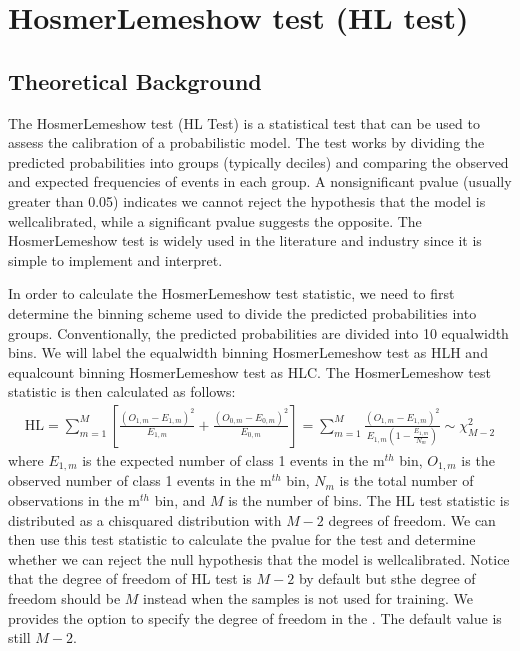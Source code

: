 \documentclass[letterpaper,10pt,english]{sphinxmanual}
\begin{document}
\sphinxstepscope


\chapter{Hosmer\sphinxhyphen{}Lemeshow test (HL test)}
\label{\detokenize{notebooks/hl_test:Hosmer-Lemeshow-test-(HL-test)}}\label{\detokenize{notebooks/hl_test::doc}}

\section{Theoretical Background}
\label{\detokenize{notebooks/hl_test:Theoretical-Background}}
\sphinxAtStartPar
The Hosmer\sphinxhyphen{}Lemeshow test (HL Test) is a statistical test that can be used to assess the calibration of a probabilistic model. The test works by dividing the predicted probabilities into groups (typically deciles) and comparing the observed and expected frequencies of events in each group. A non\sphinxhyphen{}significant p\sphinxhyphen{}value (usually greater than 0.05) indicates we cannot reject the hypothesis that the model is well\sphinxhyphen{}calibrated, while a significant p\sphinxhyphen{}value suggests the opposite. The Hosmer\sphinxhyphen{}Lemeshow test is
widely used in the literature and industry since it is simple to implement and interpret.

\sphinxAtStartPar
In order to calculate the Hosmer\sphinxhyphen{}Lemeshow test statistic, we need to first determine the binning scheme used to divide the predicted probabilities into groups. Conventionally, the predicted probabilities are divided into 10 equal\sphinxhyphen{}width bins. We will label the equal\sphinxhyphen{}width binning Hosmer\sphinxhyphen{}Lemeshow test as HL\sphinxhyphen{}H and equal\sphinxhyphen{}count binning Hosmer\sphinxhyphen{}Lemeshow test as HL\sphinxhyphen{}C. The Hosmer\sphinxhyphen{}Lemeshow test statistic is then calculated as follows:
\begin{equation*}
\begin{split}\text{HL} = \sum_{m=1}^{M} \left[\frac{(O_{1,m}-E_{1,m})^2}{E_{1,m}} + \frac{(O_{0,m}-E_{0,m})^2}{E_{0,m}}\right]  = \sum_{m=1}^{M} \frac{(O_{1,m}-E_{1,m})^2}{E_{1,m}(1-\frac{E_{1,m}}{N_m})} \sim \chi^2_{M-2}\end{split}
\end{equation*}
\sphinxAtStartPar
where \(E_{1,m}\) is the expected number of class 1 events in the \(\text{m}^{th}\) bin, \(O_{1,m}\) is the observed number of class 1 events in the \(\text{m}^{th}\) bin, \(N_m\) is the total number of observations in the \(\text{m}^{th}\) bin, and \(M\) is the number of bins. The HL test statistic is distributed as a chi\sphinxhyphen{}squared distribution with \(M-2\) degrees of freedom. We can then use this test statistic to calculate the p\sphinxhyphen{}value for the test and determine
whether we can reject the null hypothesis that the model is well\sphinxhyphen{}calibrated. Notice that the degree of freedom of HL test is \(M-2\) by default but sthe degree of freedom should be \(M\) instead when the samples is not used for training. We provides the option to specify the degree of freedom in the . The default value is still \(M-2\).
\end{document}
